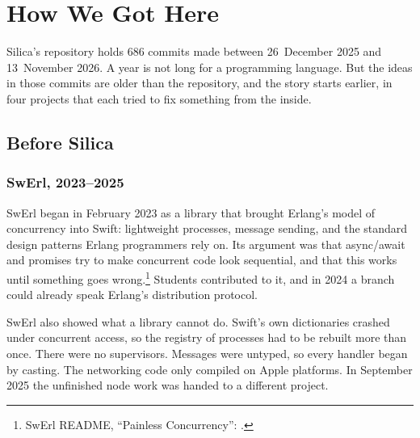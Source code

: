 \chapter{How We Got Here}
\label{ch:history}

Silica's repository holds 686 commits made between 26~December 2025 and
13~November 2026. A year is not long for a programming language. But the ideas
in those commits are older than the repository, and the story starts earlier,
in four projects that each tried to fix something from the inside.

\section{Before Silica}

\subsection{SwErl, 2023--2025}

SwErl began in February 2023 as a library that brought Erlang's model of
concurrency into Swift: lightweight processes, message sending, and the
standard design patterns Erlang programmers rely on. Its argument was that async/await and promises try to make
concurrent code look sequential, and that this works until something goes
wrong.\footnote{SwErl README, ``Painless Concurrency'':
.} Students contributed to it, and in
2024 a branch could already speak Erlang's distribution protocol.

SwErl also showed what a library cannot do. Swift's own dictionaries crashed
under concurrent access, so the registry of processes had to be rebuilt more
than once. There were no supervisors. Messages were untyped, so every handler
began by casting. The networking code only compiled on Apple platforms. In
September 2025 the unfinished node work was handed to a different project.



